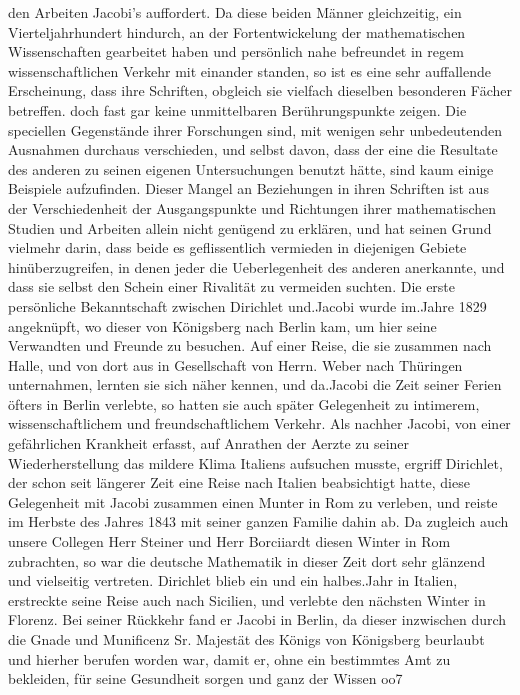 \documentclass[11pt]{article}
\begin{document}
\noindent den Arbeiten Jacobi’s auffordert. Da diese beiden Männer gleichzeitig, ein Vierteljahrhundert hindurch, an der Fortentwickelung der mathematischen Wissenschaften gearbeitet haben und persönlich nahe befreundet in regem wissenschaftlichen Verkehr mit einander standen, so ist es eine sehr auffallende Erscheinung, dass ihre Schriften, obgleich sie vielfach dieselben besonderen Fächer betreffen. doch fast gar keine unmittelbaren Berührungspunkte zeigen. Die speciellen Gegenstände ihrer Forschungen sind, mit wenigen sehr unbedeutenden Ausnahmen durchaus verschieden, und selbst davon, dass der eine die Resultate des anderen zu seinen eigenen Untersuchungen benutzt hätte, sind kaum einige Beispiele aufzufinden. Dieser Mangel an Beziehungen in ihren Schriften ist aus der Verschiedenheit der Ausgangspunkte und Richtungen ihrer mathematischen Studien und Arbeiten allein nicht genügend zu erklären, und hat seinen Grund vielmehr darin, dass beide es geflissentlich vermieden in diejenigen Gebiete hinüberzugreifen, in denen jeder die Ueberlegenheit des anderen anerkannte, und dass sie selbst den Schein einer Rivalität zu vermeiden suchten. Die erste persönliche Bekanntschaft zwischen Dirichlet und.Jacobi wurde im.Jahre 1829 angeknüpft, wo dieser von Königsberg nach Berlin kam, um hier seine Verwandten und Freunde zu besuchen. Auf einer Reise, die sie zusammen nach Halle, und von dort aus in Gesellschaft von Herrn. Weber nach Thüringen unternahmen, lernten sie sich näher kennen, und da.Jacobi die Zeit seiner Ferien öfters in Berlin verlebte, so hatten sie auch später Gelegenheit zu intimerem, wissenschaftlichem und freundschaftlichem Verkehr. Als nachher Jacobi, von einer gefährlichen Krankheit erfasst, auf Anrathen der Aerzte zu seiner Wiederherstellung das mildere Klima Italiens aufsuchen musste, ergriff Dirichlet, der schon seit längerer Zeit eine Reise nach Italien beabsichtigt hatte, diese Gelegenheit mit Jacobi zusammen einen Munter in Rom zu verleben, und reiste im Herbste des Jahres 1843 mit seiner ganzen Familie dahin ab. Da zugleich auch unsere Collegen Herr Steiner und Herr Borciiardt diesen Winter in Rom zubrachten, so war die deutsche Mathematik in dieser Zeit dort sehr glänzend und vielseitig vertreten. Dirichlet blieb ein und ein halbes.Jahr in Italien, erstreckte seine Reise auch nach Sicilien, und verlebte den nächsten Winter in Florenz. Bei seiner Rückkehr fand er Jacobi in Berlin, da dieser inzwischen durch die Gnade und Munificenz Sr. Majestät des Königs von Königsberg beurlaubt und hierher berufen worden war, damit er, ohne ein bestimmtes Amt zu bekleiden, für seine Gesundheit sorgen und ganz der Wissen oo7
\par
\end{document}
